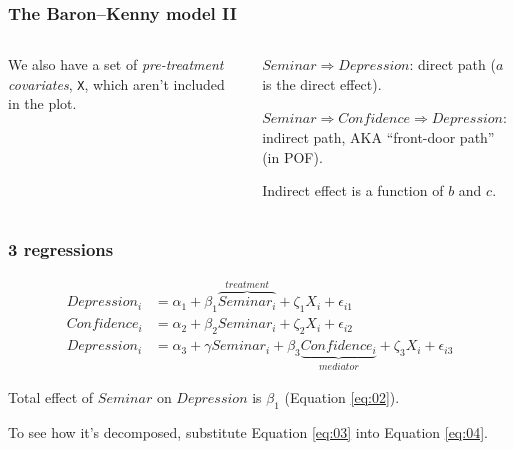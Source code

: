 \documentclass[11pt,english,dvipsnames,aspectratio=169,handout]{beamer}\usepackage[]{graphicx}\usepackage[]{xcolor}
\begin{document}
\begin{frame}
\frametitle{The Baron--Kenny model II}

\begin{columns}
		\begin{column}{0.5\textwidth}
\begin{figure}
\label{fig:03}
\end{figure}
\footnotesize

We also have a set of \textit{pre-treatment covariates}, \texttt{X}, which aren't included in the plot.
  \end{column}
  \pause
  \begin{column}{0.5\textwidth}
  \footnotesize
  
  $Seminar \Rightarrow Depression$: direct path ($a$ is the direct effect).\bigskip
  \pause
  
  $Seminar \Rightarrow Confidence \Rightarrow Depression$: indirect path, AKA ``front-door path'' (in POF).\bigskip
  \pause
  
  Indirect effect is a function of $b$ and $c$.
  
  \end{column}
\end{columns}

\end{frame}


\begin{frame}
  \frametitle{3 regressions}

   \footnotesize
   \begin{align}
   Depression_i &= \alpha_1 + \beta_1\overbrace{Seminar_i}^{treatment} + \zeta_1X_i + \epsilon_{i1} \label{eq:02}\\
   Confidence_i &= \alpha_2 + \beta_2Seminar_i + \zeta_2X_i + \epsilon_{i2} \label{eq:03}\\
   Depression_i &= \alpha_3 + \gamma Seminar_i + \beta_3\underbrace{Confidence_i}_{mediator} + \zeta_3X_i + \epsilon_{i3} \label{eq:04}
   \end{align}
  \pause
  \normalsize
  
  Total effect of $Seminar$ on $Depression$ is $\beta_1$ (Equation \ref{eq:02}).\bigskip
  
  To see how it's decomposed, substitute Equation \ref{eq:03} into Equation \ref{eq:04}.
  
\end{frame}
\end{document}
